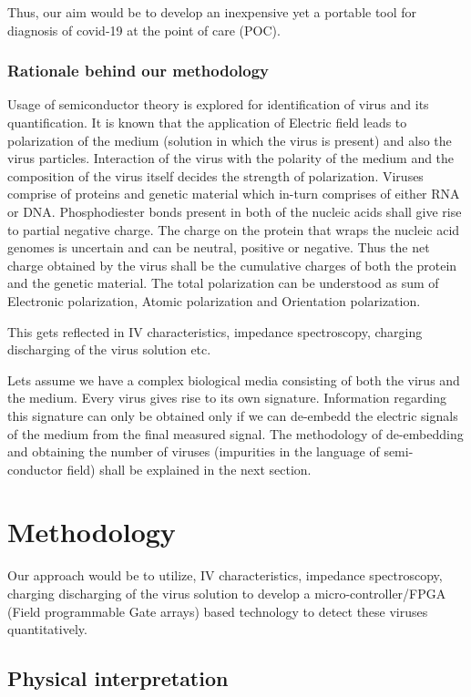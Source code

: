 \documentclass{FR16}
\begin{document}
Thus, our aim would be to develop an inexpensive yet a portable tool for diagnosis of covid-19 at the point of care (POC).


\subsubsection{Rationale behind our methodology}
Usage of semiconductor theory is explored for identification of virus and its quantification. It is known that the application of Electric field leads to polarization of the medium (solution in which the virus is present) and also the virus particles. Interaction of the virus with the polarity of the medium and the composition of the virus itself decides the strength of polarization. Viruses comprise of proteins and genetic material which in-turn comprises of either RNA or DNA. Phosphodiester bonds present in both of the nucleic acids shall give rise to partial negative charge. The charge on the protein that wraps the nucleic acid genomes is uncertain and can be neutral, positive or negative. Thus the net charge obtained by the virus shall be the cumulative charges of both the protein and the genetic material. The total polarization  can be understood as sum of Electronic polarization, Atomic polarization and Orientation polarization.

This gets reflected in IV  characteristics, impedance spectroscopy, charging discharging of the virus solution etc.

Lets assume we have a complex biological media consisting of both the virus and the medium. Every virus gives rise to its own signature. Information regarding this signature can only be obtained only if we can de-embedd  the electric signals of the medium from the final measured signal. The methodology of de-embedding and obtaining the number of viruses (impurities in the language of semi-conductor field) shall be explained in  the next section.





\newpage
\section{Methodology}
Our approach would be to utilize, IV  characteristics, impedance spectroscopy, charging discharging of the virus solution to develop a micro-controller/FPGA (Field programmable Gate arrays) based technology to detect these viruses quantitatively.

\subsection{Physical interpretation}
\end{document}
